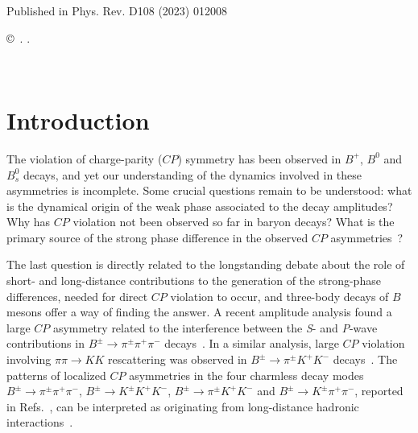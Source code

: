 \documentclass[12pt,a4paper]{article}
\def\paperlicenceurl{https://creativecommons.org/licenses/by/4.0/}
\def\Ppi         {\ensuremath{\uppi}\xspace}
\def\PB      {\ensuremath{\mathrm{B}}\xspace}
\def\PK      {\ensuremath{\mathrm{K}}\xspace}
\def\Ppi         {\ensuremath{\pi}\xspace}
\def\PB      {\ensuremath{B}\xspace}
\def\PK      {\ensuremath{K}\xspace}
\def\pion   {{\ensuremath{\Ppi}}\xspace}
\def\pip    {{\ensuremath{\pion^+}}\xspace}
\def\pim    {{\ensuremath{\pion^-}}\xspace}
\def\pipm   {{\ensuremath{\pion^\pm}}\xspace}
\def\kaon    {{\ensuremath{\PK}}\xspace}
\def\Kp      {{\ensuremath{\kaon^+}}\xspace}
\def\Km      {{\ensuremath{\kaon^-}}\xspace}
\def\Kpm     {{\ensuremath{\kaon^\pm}}\xspace}
\def\B       {{\ensuremath{\PB}}\xspace}
\def\Bpm     {{\ensuremath{\B^\pm}}\xspace}
\def\to                 {\ensuremath{\rightarrow}\xspace}
\def\CP                {{\ensuremath{C\!P}}\xspace}
\def\pipipi {\ensuremath{{\Bpm \to \pipm \pip \pim}}\xspace}
\def\kpipi {\ensuremath{{\Bpm \to \Kpm \pip \pim}}\xspace}
\def\kkpi {\ensuremath{{\Bpm \to \pipm \Kp \Km }}\xspace}
\def\kkk {\ensuremath{{\Bpm \to \Kpm \Kp \Km}}\xspace}
\begin{document}
\begin{titlepage}
\begin{abstract}
\end{abstract}

\vspace*{2.0cm}

\begin{center}
  Published in Phys. Rev. D108 (2023) 012008
\end{center}

\vspace{\fill}

{\footnotesize 
\centerline{\copyright~\papercopyright. \href{\paperlicenceurl}{\paperlicence}.}}
\vspace*{2mm}

\end{titlepage}




\newpage
\setcounter{page}{2}
\mbox{~}












 

\renewcommand{\thefootnote}{\arabic{footnote}}
\setcounter{footnote}{0}

\cleardoublepage




\pagestyle{plain} \setcounter{page}{1}





\section{Introduction}
\label{sec:introduction}

The violation of charge-parity (\CP) symmetry has been observed in $B^+$, $B^0$ and $B^0_s$ decays, and yet our understanding of the dynamics involved in these asymmetries is incomplete. Some crucial questions remain to be understood: what is the dynamical origin of the weak phase associated to the decay amplitudes? Why has \CP violation not been observed so far in baryon decays? What is the primary source of the strong phase difference in the observed \CP asymmetries~\cite{BediagaGobel}?

The last question is directly related to the longstanding debate about the role of short- and long-distance contributions to the
generation of the strong-phase differences, needed for direct \CP violation to occur, and three-body decays of $B$ mesons offer a way of finding the answer. 
A recent amplitude analysis found a large \CP asymmetry related to the interference between the \textit{S}- and \textit{P}-wave contributions in \pipipi decays~\cite{LHCb-PAPER-2019-017,LHCb-PAPER-2019-018}. 
In a similar  analysis, large \CP violation involving $\pi\pi \to KK$ rescattering was observed in \kkpi decays~\cite{LHCb-PAPER-2018-051}.
The patterns of localized \CP asymmetries in the four charmless decay modes \pipipi, \kkk, \kkpi and \kpipi, reported in Refs.~\cite{LHCb-PAPER-2013-051,LHCb-PAPER-2014-044}, can be interpreted as originating from long-distance hadronic interactions~\cite{BediagaGobel}.
\end{document}
